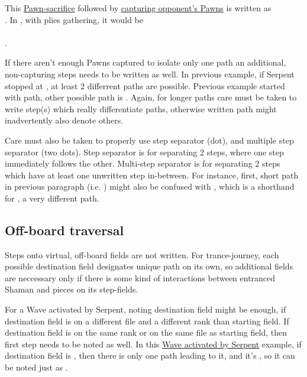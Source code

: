 This \hyperref[fig:scn_tr_27_pawn_sacrifice_init]{Pawn-sacrifice} followed by
\hyperref[fig:scn_tr_28_pawn_sacrifice_end]{capturing opponent's Pawns} is written as \\
. In , with plies
gathering, it would be \\
\alg{[Sr14-m15]\~{}[Am15-m11];;}\\
\alg{[Sm15..m17*..m19*.l20*.m21*.n20*.o21*]}.

If there aren't enough Pawns captured to isolate only one path an additional, non-capturing
steps needs to be written as well. In previous example, if Serpent stopped at , at
least 2 differrent paths are possible. Previous example started with
 path, other possible path is .
Again, for longer paths care must be taken to write step(s) which really differentiate paths,
otherwise written path might inadvertently also denote others.

Care must also be taken to properly use step separator  (dot), and multiple step
separator  (two dots). Step separator  is for separating 2 steps, where one
step immediately follows the other. Multi-step separator  is for separating 2 steps
which have at least one unwritten step in-between. For instance, first, short path in
previous paragraph (i.e. ) might also be confused with
, which is a shorthand for
, a very different path.

\subsection*{Off-board traversal}
\label{sec:Appendix/Notation/Off-board traversal}

Steps onto virtual, off-board fields are not written. For trance-journey, each possible
destination field designates unique path on its own, so additional fields are neccessary
only if there is some kind of interactions between entranced Shaman and pieces on its
step-fields.

For a Wave activated by Serpent, noting destination field might be enough, if destination
field is on a different file and a different rank than starting field. If destination field
is on the same rank or on the same file as starting field, then first step needs to be noted
as well. In this \hyperref[fig:scn_tr_32_serpent_activated_wave_ply]{Wave activated by Serpent}
example, if destination field is , then there is only one path leading to it, and
it's , so it can be noted just as .

